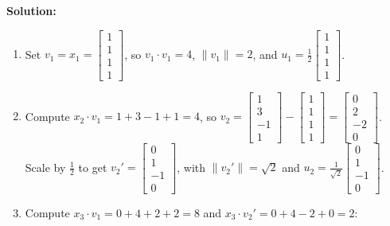 \documentclass[11pt, letterpaper]{article}
\theoremstyle{definition}
\theoremstyle{remark}
\begin{document}
\textbf{Solution:}
\begin{enumerate}[label=\textbf{Step \arabic*:}]
    \item Set $v_1 = x_1 = \begin{bmatrix} 1 \\ 1 \\ 1 \\ 1 \end{bmatrix}$, so $v_1 \cdot v_1 = 4$, $\|v_1\| = 2$, and $u_1 = \frac{1}{2}\begin{bmatrix} 1 \\ 1 \\ 1 \\ 1 \end{bmatrix}$.
    \item Compute $x_2 \cdot v_1 = 1 + 3 - 1 + 1 = 4$, so $v_2 = \begin{bmatrix} 1 \\ 3 \\ -1 \\ 1 \end{bmatrix} - \begin{bmatrix} 1 \\ 1 \\ 1 \\ 1 \end{bmatrix} = \begin{bmatrix} 0 \\ 2 \\ -2 \\ 0 \end{bmatrix}$. Scale by $\frac{1}{2}$ to get $v_2' = \begin{bmatrix} 0 \\ 1 \\ -1 \\ 0 \end{bmatrix}$, with $\|v_2'\| = \sqrt{2}$ and $u_2 = \frac{1}{\sqrt{2}}\begin{bmatrix} 0 \\ 1 \\ -1 \\ 0 \end{bmatrix}$.
    \item Compute $x_3 \cdot v_1 = 0 + 4 + 2 + 2 = 8$ and $x_3 \cdot v_2' = 0 + 4 - 2 + 0 = 2$:
    \[
\]
\end{enumerate}
\end{document}
